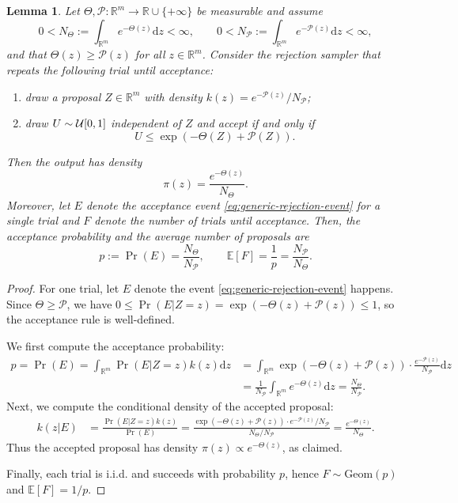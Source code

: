 \documentclass[11pt,letterpaper]{article}
\newcommand{\R}{\mathbb{R}}
\newcommand{\E}{\mathbb{E}}
\newcommand{\D}{\mathrm{d}}
\newtheorem{lemma}[thm]{Lemma}
\begin{document}
\begin{lemma}\label{lem:rejection}  
Let $\Theta,\mathcal{P}:\R^{m}\to\R\cup\{+\infty\}$ be measurable and assume
\[
0<N_\Theta:=\int_{\R^m} e^{-\Theta(z)}  \D z<\infty,
\qquad
0<N_{\mathcal{P}}:=\int_{\R^m} e^{-\mathcal{P}(z)}  \D z<\infty,
\]
and that $\Theta(z)\ge \mathcal{P}(z)$ for all $z\in\R^m$.
Consider the rejection sampler that repeats the following trial until acceptance:
\begin{enumerate}
    \item draw a proposal $Z\in\R^m$ with density $k(z)=e^{-\mathcal{P}(z)}/N_{\mathcal{P}}$;
    \item draw $U\sim{\cal U}[0,1]$ independent of $Z$ and accept if and only if
    \begin{equation}\label{eq:generic-rejection-event}
        U\le \exp\left(-\Theta(Z)+\mathcal{P}(Z)\right).
    \end{equation}
\end{enumerate}
Then the output has density
\[
\pi(z)=\frac{e^{-\Theta(z)}}{N_\Theta}.
\]
Moreover, let $E$ denote the acceptance event \eqref{eq:generic-rejection-event} for a single trial and $F$ denote the number of trials until acceptance. Then, the acceptance probability and the average number of proposals are
\begin{equation}\label{eq:generic-accept-rate}
p:=\Pr(E)=\frac{N_\Theta}{N_{\mathcal{P}}},
\qquad
\mathbb{E}[F] =\frac{1}{p}=\frac{N_{\mathcal{P}}}{N_\Theta}.
\end{equation}
\end{lemma}

\begin{proof}
For one trial, let $E$ denote the event \eqref{eq:generic-rejection-event} happens.
Since $\Theta\ge \mathcal{P}$, we have $0\le \Pr(E| Z=z)=\exp(-\Theta(z)+\mathcal{P}(z))\le 1$,
so the acceptance rule is well-defined.

We first compute the acceptance probability:
\begin{align*}
p=\Pr(E)
=\int_{\R^m}\Pr(E| Z=z) k(z)  \D z &=\int_{\R^m}\exp\left(-\Theta(z)+\mathcal{P}(z)\right)\cdot \frac{e^{-\mathcal{P}(z)}}{N_{\mathcal{P}}}  \D z \\
&=\frac{1}{N_{\mathcal{P}}}\int_{\R^m}e^{-\Theta(z)}  \D z
=\frac{N_\Theta}{N_{\mathcal{P}}}.
\end{align*}
Next, we compute the conditional density of the accepted proposal:
\begin{align*}
k(z| E)
&=\frac{\Pr(E| Z=z) k(z)}{\Pr(E)} =\frac{\exp\left(-\Theta(z)+\mathcal{P}(z)\right)\cdot e^{-\mathcal{P}(z)}/N_{\mathcal{P}}}{N_\Theta/N_{\mathcal{P}}}
=\frac{e^{-\Theta(z)}}{N_\Theta}.
\end{align*}
Thus the accepted proposal has density $\pi(z)\propto e^{-\Theta(z)}$, as claimed.

Finally, each trial is i.i.d. and succeeds with probability $p$, hence $F\sim\mathrm{Geom}(p)$ and
$\E[F]=1/p$.
\end{proof}
\end{document}
